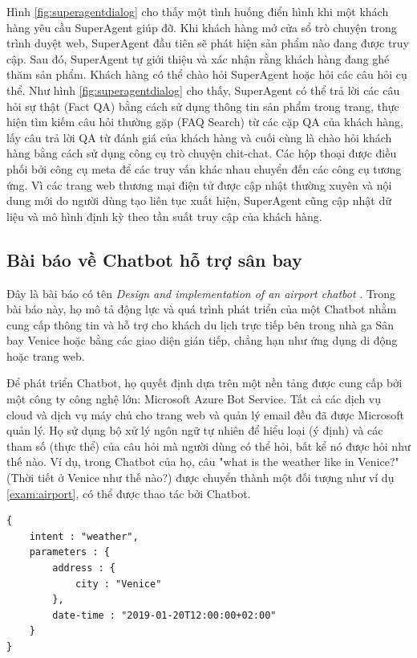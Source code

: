 Hình \ref{fig:superagentdialog} cho thấy một tình huống điển hình khi một khách hàng yêu cầu SuperAgent giúp đỡ. Khi khách hàng mở cửa sổ trò chuyện trong trình duyệt web, SuperAgent đầu tiên sẽ phát hiện sản phẩm nào đang được truy cập. Sau đó, SuperAgent tự giới thiệu và xác nhận rằng khách hàng đang ghé thăm sản phẩm. Khách hàng có thể chào hỏi SuperAgent hoặc hỏi các câu hỏi cụ thể. Như hình \ref{fig:superagentdialog} cho thấy, SuperAgent có thể trả lời các câu hỏi sự thật (Fact QA) bằng cách sử dụng thông tin sản phẩm trong trang, thực hiện tìm kiếm câu hỏi thường gặp (FAQ Search) từ các cặp QA của khách hàng, lấy câu trả lời QA từ đánh giá của khách hàng và cuối cùng là chào hỏi khách hàng bằng cách sử dụng công cụ trò chuyện chit-chat. Các hộp thoại được điều phối bởi công cụ meta để các truy vấn khác nhau chuyển đến các công cụ tương ứng. Vì các trang web thương mại điện tử được cập nhật thường xuyên và nội dung mới do người dùng tạo liên tục xuất hiện, SuperAgent cũng cập nhật dữ liệu và mô hình định kỳ theo tần suất truy cập của khách hàng.

\subsection{Bài báo về Chatbot hỗ trợ sân bay}
Đây là bài báo có tên \textit{Design and implementation of an airport chatbot} \cite{airport}. Trong bài báo này, họ mô tả động lực và quá trình phát triển của một Chatbot nhằm cung cấp thông tin và hỗ trợ cho khách du lịch trực tiếp bên trong nhà ga Sân bay Venice hoặc bằng các giao diện gián tiếp, chẳng hạn như ứng dụng di động hoặc trang web.

Để phát triển Chatbot, họ quyết định dựa trên một nền tảng được cung cấp bởi một công ty công nghệ lớn: Microsoft Azure Bot Service. Tất cả các dịch vụ cloud và dịch vụ máy chủ cho trang web và quản lý email đều đã được Microsoft quản lý. Họ sử dụng bộ xử lý ngôn ngữ tự nhiên để hiểu loại (ý định) và các tham số (thực thể) của câu hỏi mà người dùng có thể hỏi, bất kể nó được hỏi như thế nào. Ví dụ, trong Chatbot của họ, câu "what is the weather like in Venice?" (Thời tiết ở Venice như thế nào?) được chuyển thành một đối tượng như ví dụ \ref{exam:airport}, có thể được thao tác bởi Chatbot.

\renewcommand{\lstlistingname}{Ví dụ}
\begin{lstlisting}[caption={Biểu diễn của một câu hỏi},label={exam:airport},language=code_en,firstnumber=1]
{
    intent : "weather",
    parameters : {
        address : {
            city : "Venice"
        },
        date-time : "2019-01-20T12:00:00+02:00"
    }
}
\end{lstlisting}

